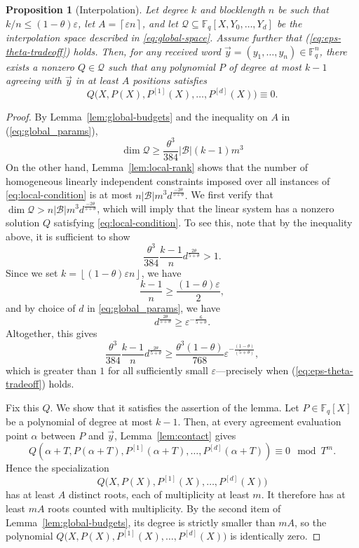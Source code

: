 \documentclass[11pt]{article}
\newtheorem{proposition}[theorem]{Proposition}
\newcommand{\F}{\mathbb F}
\newcommand{\eps}{\varepsilon}
\newcommand{\kai}[1]{{\color{red} {{[Kai: #1]}}}}
\newcommand{\josh}[1]{{\color{green!50!black} {{[Josh: #1]}}}}
\begin{document}
\begin{proposition}[Interpolation]\label{prop:interpolation}
Let degree $k$ and blocklength $n$ be such that $k/n \le (1-\theta)\eps$, let $A = \left\lceil \eps n \right\rceil$, and let $\mathcal{Q} \subseteq \F_q[X,Y_0,\ldots, Y_d]$ be the interpolation space described in \eqref{eq:global-space}. Assume further that (\ref{eq:eps-theta-tradeoff}) holds.
Then, for any received word $\vec{y}=(y_1,\dots,y_n)\in\F_q^n$, there exists a nonzero $Q \in \mathcal{Q}$ such that any polynomial \(P\) of degree at most \(k-1\) agreeing with
$\vec{y}$ in at least \(A\) positions satisfies
\[
Q\bigl(X,P(X),P^{[1]}(X),\ldots,P^{[d]}(X)\bigr)\equiv0.
\]
\end{proposition}
\begin{proof}
By Lemma~\ref{lem:global-budgets} and the inequality on $A$ in (\ref{eq:global_params}),
\[
\dim\mathcal Q \geq \frac{\theta^3}{384}|\mathcal{B}|(k-1) m^3
\]
On the other hand, Lemma~\ref{lem:local-rank} shows that the number of homogeneous linearly independent constraints imposed over all instances of \eqref{eq:local-condition} is at most $n|\mathcal{B}| m^3 d^{\frac{-2\theta}{5+\theta}}.$
We first verify that $\dim\mathcal Q>n|\mathcal{B}| m^3 d^{\frac{-2\theta}{5+\theta}}$, which will imply that the
linear system has a nonzero solution $Q$ satisfying \eqref{eq:local-condition}. To see this, note that by the inequality above, it is sufficient to show 
\[
\frac{\theta^3}{384} \frac{k-1}{n}d^{\frac{2\theta}{5+\theta}} > 1.
\]
Since we set $k =\left \lfloor (1-\theta) \eps n \right\rfloor$, we have 
\[
\frac{k-1}{n} \geq \frac{(1-\theta)\eps}{2},
\]
and by choice of $d$ in \eqref{eq:global_params}, we have 
\[
d^{\frac{2\theta}{5+\theta}} \geq \eps^{-\frac{6}{5+\theta}}.
\]
Altogether, this gives 
\[
\frac{\theta^3}{384} \frac{k-1}{n}d^{\frac{2\theta}{5+\theta}}  \geq \frac{\theta^3(1-\theta)}{768} \eps^{-\frac{(1-\theta)}{(5+\theta)}},
\]
which is greater than $1$ for all sufficiently small $\eps$---precisely when (\ref{eq:eps-theta-tradeoff}) holds. 

 Fix this $Q$. We show that it satisfies the assertion of the lemma. Let $P \in \F_q[X]$ be a polynomial of degree at most $k-1$. Then, at every agreement evaluation point \(\alpha\) between $P$ and $\vec{y}$,
Lemma~\ref{lem:contact} gives
\[
Q\!\left(
\alpha+T,P(\alpha+T),P^{[1]}(\alpha+T),\ldots,P^{[d]}(\alpha+T)
\right)
\equiv0\mod{T^m}.
\]
Hence the specialization
\[
Q\bigl(X,P(X),P^{[1]}(X),\ldots,P^{[d]}(X)\bigr)
\]
has at least \(A\) distinct roots, each of multiplicity at least \(m\).
It therefore has at least \(mA\) roots counted with multiplicity.
By the second item of Lemma~\ref{lem:global-budgets}, its degree is strictly smaller than
\(mA\), so the polynomial $Q\bigl(X,P(X),P^{[1]}(X),\ldots,P^{[d]}(X)\bigr)$ is identically zero.
\end{proof}
\end{document}
